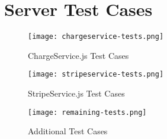 \chapter{Server Test Cases}
\label{appendix:server-test-cases}

\begin{figure}[!hbt]
  	\centering
 	\texttt{[image: chargeservice-tests.png]}
  	\caption{ChargeService.js Test Cases}
 	\label{fig:chargeservice-tests}
\end{figure}

\begin{figure}[!hbt]
  	\centering
 	\texttt{[image: stripeservice-tests.png]}
  	\caption{StripeService.js Test Cases}
 	\label{fig:stripeservice-tests}
\end{figure}

\begin{figure}[!hbt]
  	\centering
 	\texttt{[image: remaining-tests.png]}
  	\caption{Additional Test Cases}
 	\label{fig:additional-tests}
\end{figure}